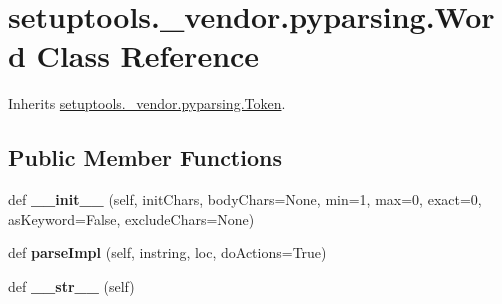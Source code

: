 \hypertarget{classsetuptools_1_1__vendor_1_1pyparsing_1_1_word}{}\section{setuptools.\+\_\+vendor.\+pyparsing.\+Word Class Reference}
\label{classsetuptools_1_1__vendor_1_1pyparsing_1_1_word}


Inherits \hyperlink{classsetuptools_1_1__vendor_1_1pyparsing_1_1_token}{setuptools.\+\_\+vendor.\+pyparsing.\+Token}.

\subsection*{Public Member Functions}
\begin{DoxyCompactItemize}
\item 
\mbox{\label{classsetuptools_1_1__vendor_1_1pyparsing_1_1_word_a5d01dab132df36cc4b71f3c78db0851a}} 
def {\bfseries \+\_\+\+\_\+init\+\_\+\+\_\+} (self, init\+Chars, body\+Chars=None, min=1, max=0, exact=0, as\+Keyword=False, exclude\+Chars=None)
\item 
\mbox{\label{classsetuptools_1_1__vendor_1_1pyparsing_1_1_word_a0fe8c6e2e60277b436269ddd4aa6ca3e}} 
def {\bfseries parse\+Impl} (self, instring, loc, do\+Actions=True)
\item 
\mbox{\label{classsetuptools_1_1__vendor_1_1pyparsing_1_1_word_ab66853bda08300609de8487b04db4f85}} 
def {\bfseries \+\_\+\+\_\+str\+\_\+\+\_\+} (self)
\end{DoxyCompactItemize}
